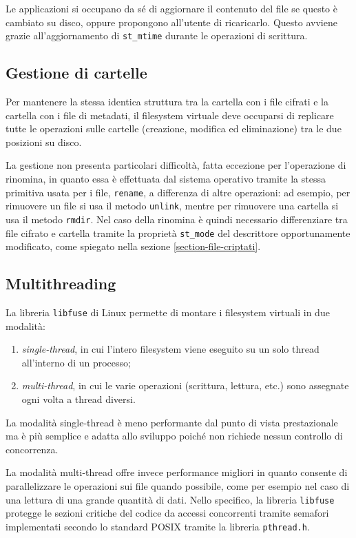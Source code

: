 \documentclass[a4paper,12pt,twoside,openright]{report}
\begin{document}
  Le applicazioni si occupano da sé di aggiornare il contenuto del file se
  questo è cambiato su disco, oppure propongono all'utente di ricaricarlo. Questo avviene
  grazie all'aggiornamento di \texttt{st\_mtime} durante le operazioni di scrittura.

  \subsection{Gestione di cartelle}

  Per mantenere la stessa identica struttura tra la cartella con i file cifrati e la cartella
  con i file di metadati, il filesystem virtuale deve occuparsi di replicare 
  tutte le operazioni sulle cartelle (creazione, modifica ed eliminazione) tra le due posizioni su disco.

  La gestione non presenta particolari difficoltà, fatta eccezione per l'operazione
  di rinomina, in quanto essa è effettuata dal sistema operativo tramite la stessa primitiva usata
  per i file, \texttt{rename},
  a differenza di altre operazioni: ad esempio, per rimuovere un file si usa il metodo \texttt{unlink},
  mentre per rimuovere una cartella si usa il metodo \texttt{rmdir}.
  Nel caso della rinomina è quindi necessario differenziare tra file cifrato e cartella tramite la proprietà
  \texttt{st\_mode} del descrittore opportunamente modificato, come spiegato nella sezione \ref{section-file-criptati}.

  \subsection{Multithreading}

  La libreria \texttt{libfuse} di Linux permette di montare i filesystem virtuali in due modalità:
  \begin{enumerate}
    \item \textit{single-thread}, in cui l'intero filesystem viene eseguito su un solo thread all'interno di un processo;
    \item \textit{multi-thread}, in cui le varie operazioni (scrittura, lettura, etc.) sono assegnate ogni volta a thread diversi.
  \end{enumerate}

  La modalità single-thread è meno performante dal punto di vista prestazionale
  ma è più semplice e adatta allo sviluppo poiché non richiede nessun controllo di concorrenza.

  La modalità multi-thread offre invece performance migliori in quanto consente di parallelizzare le operazioni
  sui file quando possibile, come per esempio nel caso di una lettura di una grande quantità di dati.
  Nello specifico, la libreria \texttt{libfuse} protegge le sezioni critiche del codice da accessi concorrenti tramite
  semafori implementati secondo lo standard POSIX tramite la libreria \texttt{pthread.h}.
\end{document}
